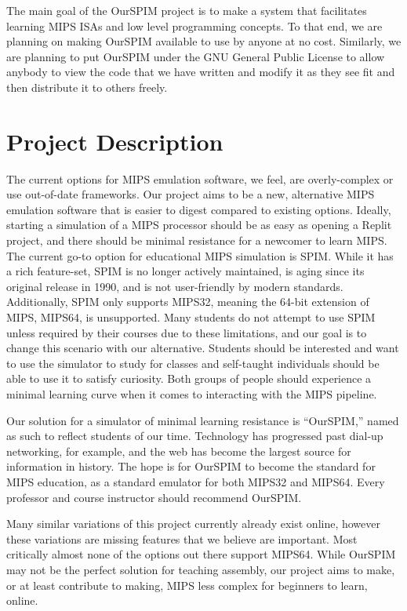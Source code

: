 \documentclass[parskip=half, fontsize=12pt]{scrartcl}
\begin{document}
The main goal of the OurSPIM project is to make a system that facilitates learning MIPS ISAs and low level programming concepts. To that end, we are planning on making OurSPIM available to use by anyone at no cost. Similarly, we are planning to put OurSPIM under the GNU General Public License to allow anybody to view the code that we have written and modify it as they see fit and then distribute it to others freely. 


\section{Project Description}
The current options for MIPS emulation software, we feel, are overly-complex or use out-of-date frameworks. Our project aims to be a new, alternative MIPS emulation software that is easier to digest compared to existing options. Ideally, starting a simulation of a MIPS processor should be as easy as opening a Replit project, and there should be minimal resistance for a newcomer to learn MIPS. The current go-to option for educational MIPS simulation is SPIM. While it has a rich feature-set, SPIM is no longer actively maintained, is aging since its original release in 1990, and is not user-friendly by modern standards. Additionally, SPIM only supports MIPS32, meaning the 64-bit extension of MIPS, MIPS64, is unsupported. Many students do not attempt to use SPIM unless required by their courses due to these limitations, and our goal is to change this scenario with our alternative. Students should be interested and want to use the simulator to study for classes and self-taught individuals should be able to use it to satisfy curiosity. Both groups of people should experience a minimal learning curve when it comes to interacting with the MIPS pipeline.

Our solution for a simulator of minimal learning resistance is ``OurSPIM,'' named as such to reflect students of our time. Technology has progressed past dial-up networking, for example, and the web has become the largest source for information in history. The hope is for OurSPIM to become the standard for MIPS education, as a standard emulator for both MIPS32 and MIPS64. Every professor and course instructor should recommend OurSPIM.

Many similar variations of this project currently already exist online, however these variations are missing features that we believe are important. Most critically almost none of the options out there support MIPS64. While OurSPIM may not be the perfect solution for teaching assembly, our project aims to make, or at least contribute to making, MIPS less complex for beginners to learn, online.
\end{document}
